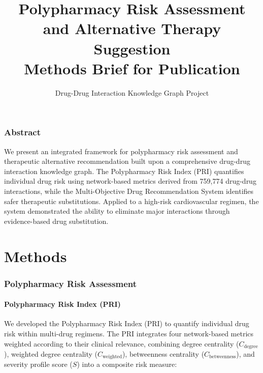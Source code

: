 \documentclass[11pt,a4paper]{article}
\title{\textbf{Polypharmacy Risk Assessment and Alternative Therapy Suggestion}\\
\large Methods Brief for Publication}
\author{Drug-Drug Interaction Knowledge Graph Project}
\date{}
\begin{document}
\maketitle

\section*{Abstract}

We present an integrated framework for polypharmacy risk assessment and therapeutic alternative recommendation built upon a comprehensive drug-drug interaction knowledge graph. The Polypharmacy Risk Index (PRI) quantifies individual drug risk using network-based metrics derived from 759,774 drug-drug interactions, while the Multi-Objective Drug Recommendation System identifies safer therapeutic substitutions. Applied to a high-risk cardiovascular regimen, the system demonstrated the ability to eliminate major interactions through evidence-based drug substitution.

\tableofcontents
\newpage


\part{Methods}

\section{Polypharmacy Risk Assessment}

\subsection{Polypharmacy Risk Index (PRI)}

We developed the Polypharmacy Risk Index (PRI) to quantify individual drug risk within multi-drug regimens. The PRI integrates four network-based metrics weighted according to their clinical relevance, combining degree centrality ($C_{\text{degree}}$), weighted degree centrality ($C_{\text{weighted}}$), betweenness centrality ($C_{\text{betweenness}}$), and severity profile score ($S$) into a composite risk measure:
\end{document}

